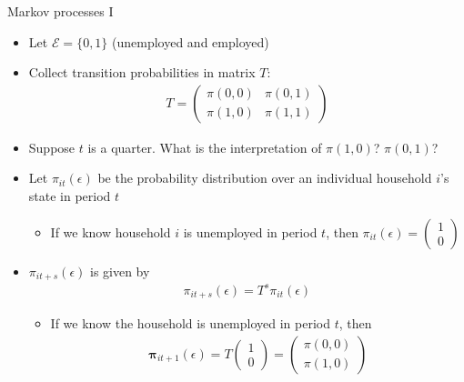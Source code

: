 \documentclass[9pt]{beamer}
\newcommand{\bit}{\begin{itemize}}
\newcommand{\eit}{\end{itemize}}
\begin{document}
\begin{frame}{Markov processes I}

\bit
\setlength\itemsep{1.5em}

\item Let $\mathcal E = \{0, 1\}$ (unemployed and employed)

\item Collect transition probabilities in matrix $T$:
\begin{eqnarray}
T = \left( \begin{array}{cc}
\pi(0,0) & \pi(0,1) \\
\pi(1,0) & \pi(1,1)
\end{array}\right) \nonumber
\end{eqnarray}

\item Suppose $t$ is a quarter. What is the interpretation of $\pi(1,0)$? $\pi(0,1)$?

\item Let $\pi_{it}(\epsilon)$ be the probability distribution over an individual household $i$'s state in period $t$
\bit
	\item If we know household $i$ is unemployed in period $t$, then $ \pi_{it}(\epsilon) = \left( \begin{array}{c}
	1 \\
	0
	\end{array}\right)$
\eit

\item $\pi_{it+s}(\epsilon)$ is given by
\begin{eqnarray}
\pi_{it+s}(\epsilon) = T^s \pi_{it}(\epsilon)\nonumber
\end{eqnarray}
\bit
	\item If we know the household is unemployed in period $t$, then 
\begin{eqnarray}
\bm \pi_{it+1}(\epsilon) = T \left( \begin{array}{c}
1 \\
0
\end{array}\right) = \left( \begin{array}{c}
\pi(0,0) \\
\pi(1,0)
\end{array}\right) \nonumber
\end{eqnarray}
	
\eit

\eit

\end{frame}
\end{document}
